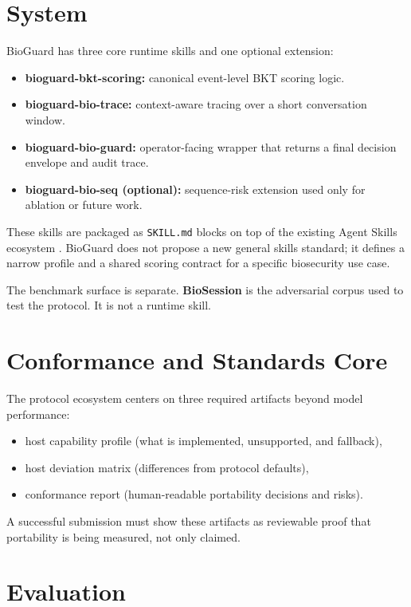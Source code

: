 \documentclass[10.5pt,a4paper]{article}
\begin{document}
\section*{System}

BioGuard has three core runtime skills and one optional extension:
\begin{itemize}[leftmargin=1.2em]
  \item \textbf{bioguard-bkt-scoring:} canonical event-level BKT scoring logic.
  \item \textbf{bioguard-bio-trace:} context-aware tracing over a short conversation window.
  \item \textbf{bioguard-bio-guard:} operator-facing wrapper that returns a final decision envelope and audit trace.
  \item \textbf{bioguard-bio-seq (optional):} sequence-risk extension used only for ablation or future work.
\end{itemize}

These skills are packaged as \texttt{SKILL.md} blocks on top of the existing Agent Skills ecosystem \cite{agentskills2026,claude2026,githubclispec,copilot2026,openai2026}. BioGuard does not propose a new general skills standard; it defines a narrow profile and a shared scoring contract for a specific biosecurity use case.

The benchmark surface is separate. \textbf{BioSession} is the adversarial corpus used to test the protocol. It is not a runtime skill.

\section*{Conformance and Standards Core}

The protocol ecosystem centers on three required artifacts beyond model performance:
\begin{itemize}[leftmargin=1.2em]
  \item host capability profile (what is implemented, unsupported, and fallback),
  \item host deviation matrix (differences from protocol defaults),
  \item conformance report (human-readable portability decisions and risks).
\end{itemize}

A successful submission must show these artifacts as reviewable proof that portability is being measured, not only claimed.

\section*{Evaluation}
\end{document}
